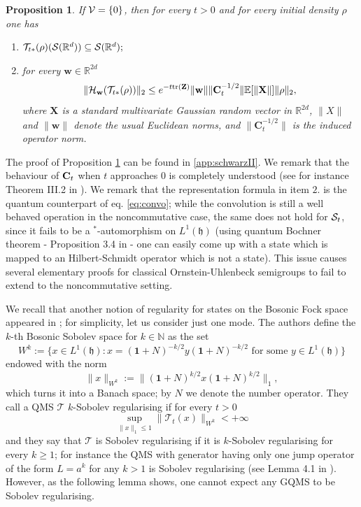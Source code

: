 \documentclass[preprint]{elsarticle}
\newtheorem{prop}[defi]{Proposition}
\theoremstyle{definition}
\def\hh{\mathfrak{h} }
\def\nn{\mathbb{N}}
\def\RR{\mathbb{R}}
\def\TT{\mathcal{T}}
\def\hh{\mathfrak{h}}
\def\tr{{\rm tr}}
\begin{document}
\begin{prop} \label{prop:schwarz}
    If ${\cal V}=\{0\}$, then for every $t>0$ and for every initial density $\rho$ one has
    \begin{enumerate}
        \item $\TT_{t*}(\rho) ({\cal S}(\RR^{d})) \subseteq {\cal S}(\RR^{d});$
        \item for every $\mathbf{w} \in \RR^{2d}$
        $$\|{\cal H}_{\mathbf{w}}(\TT_{t*}(    \rho))\|_2\leq e^{-t\tr(\mathbf{Z})}\|\mathbf{w}\|\|\mathbf{C}_t^{-1/2}\|\mathbb{E}[\|\mathbf{X}\|]\|\rho\|_2,$$
        where $\mathbf{X}$ is a standard multivariate Gaussian random vector in $\RR^{2d}$, $\|X\|$ and $\|\mathbf{w}\|$ denote the usual Euclidean norms, and $\|\mathbf{C}_t^{-1/2}\|$ is the induced operator norm.
    \end{enumerate}
\end{prop}

The proof of Proposition \ref{prop:schwarz} can be found in \ref{app:schwarzII}. We remark that the behaviour of ${\bf C}_t$ when $t$ approaches $0$ is completely understood (see for instance Theorem III.2 in \cite{SP23}). We remark that the representation formula in item $2.$ is the quantum counterpart of eq. \eqref{eq:convo}; while the convolution is still a well behaved operation in the noncommutative case, the same does not hold for ${\cal S}_t$, since it fails to be a $^*$-automorphism on $L^1(\hh)$ (using quantum Bochner theorem - Proposition 3.4 in \cite{We84} - one can easily come up with a state which is mapped to an Hilbert-Schmidt operator which is not a state). This issue causes several elementary proofs for classical Ornstein-Uhlenbeck semigroups to fail to extend to the noncommutative setting.

We recall that another notion of regularity for states on the Bosonic Fock space appeared in \cite{RGM25}; for simplicity, let us consider just one mode. The authors define the $k$-th Bosonic Sobolev space for $k \in \nn$ as the set
$$W^{k}:=\{x \in L^1(\hh): x=(\mathbf{1}+N)^{-k/2}y(\mathbf{1}+N)^{-k/2} \text{ for some } y \in L^1(\hh)\}$$
endowed with the norm
$$\|x\|_{W^{k}}:=\|(\mathbf{1}+N)^{k/2}x(\mathbf{1}+N)^{k/2}\|_1,$$
which turns it into a Banach space; by $N$ we denote the number operator. They call a QMS $\TT$ $k$-Sobolev regularising if for every $t>0$
$$\sup_{\|x\|_1\leq 1}\|\TT_t(x)\|_{W^{k}}<+\infty$$
and they say that $\TT$ is Sobolev regularising if it is $k$-Sobolev regularising for every $k \geq 1$; for instance the QMS with generator having only one jump operator of the form $L=a^k$ for any $k>1$ is Sobolev regularising (see Lemma 4.1 in \cite{RGM25}). However, as the following lemma shows, one cannot expect any GQMS to be Sobolev regularising.
\end{document}
